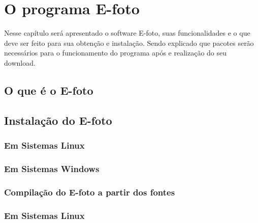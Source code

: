 \chapter{O programa E-foto}

Nesse capítulo será apresentado o software E-foto, suas funcionalidades e o que deve ser feito para sua obtenção e instalação. Sendo explicado que pacotes serão necessários para o funcionamento do programa após e realização do seu download.

\section{O que é o E-foto}

\section{Instalação do E-foto}
\subsection{Em Sistemas Linux}
\subsection{Em Sistemas Windows}

\subsection{Compilação do E-foto a partir dos fontes}
\subsection{Em Sistemas Linux}

